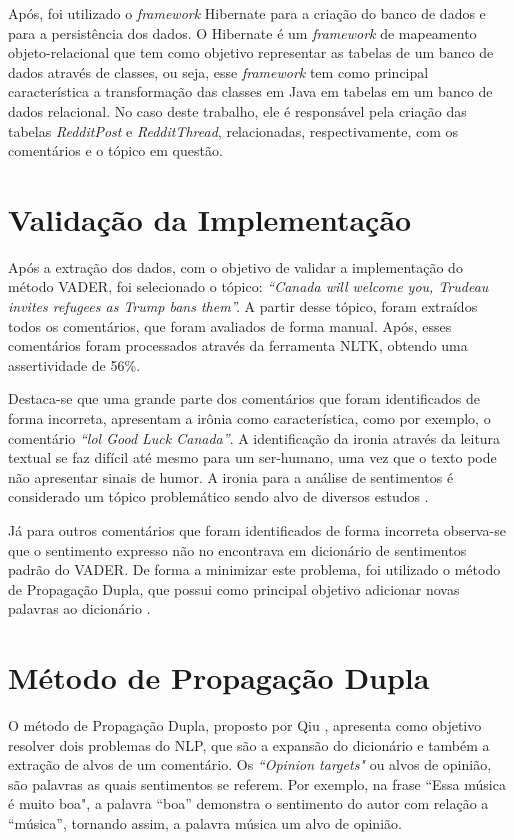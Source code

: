 Após, foi utilizado o \textit{framework} Hibernate
\cite{Iverson:2004:HJD:1044870} para a criação do banco de dados e para a
persistência dos dados. O Hibernate é um \textit{framework} de
mapeamento objeto-relacional que tem como objetivo representar as tabelas de um
banco de dados através de classes, ou seja, esse \textit{framework} tem como principal
característica a transformação das classes em Java em tabelas em um banco de
dados relacional.
No caso deste trabalho, ele é responsável pela criação das tabelas \textit{RedditPost} e
\textit{RedditThread}, relacionadas, respectivamente, com os comentários e o
tópico em questão. 

\section{Validação da Implementação}

Após a extração dos dados, com o objetivo de validar a implementação
do método \ac{VADER}, foi selecionado o tópico:
\textit{``Canada will welcome you, Trudeau invites refugees as Trump bans
them''.}
A partir desse tópico, foram extraídos todos os comentários, que foram avaliados
de forma manual. Após, esses comentários foram processados através da ferramenta
\ac{NLTK}, obtendo uma assertividade de 56\%.

Destaca-se que uma grande parte dos comentários que foram identificados de forma
incorreta, apresentam a irônia como característica, como por exemplo, o
comentário \textit{``lol Good Luck Canada''}. A identificação da ironia através
da leitura textual se faz difícil até mesmo para um ser-humano, uma vez que o
texto pode não apresentar sinais de humor. A ironia para a análise de sentimentos é considerado
um tópico problemático sendo alvo de diversos estudos \cite{DBLP:conf/lrec/StranisciBFP16}.

Já para outros comentários que foram identificados de forma incorreta
observa-se que o sentimento expresso não no encontrava em dicionário de
sentimentos padrão do \ac{VADER}. De forma a minimizar este problema, foi
utilizado o método de Propagação Dupla, que possui como principal objetivo
adicionar novas palavras ao dicionário \cite{Qiu:2011:OWE:1970420.1970422}.

\section{Método de Propagação Dupla}

O método de Propagação Dupla, proposto por Qiu
\cite{Qiu:2011:OWE:1970420.1970422}, apresenta como objetivo resolver dois
problemas do \ac{NLP}, que são a expansão do dicionário e também a extração de
alvos de um comentário. Os \textit{``Opinion targets"} ou alvos de opinião, são
palavras as quais sentimentos se referem. Por exemplo, na frase ``Essa
música é muito boa", a palavra ``boa'' demonstra o sentimento do autor com relação a
``música'', tornando assim, a palavra música um alvo de opinião. 

